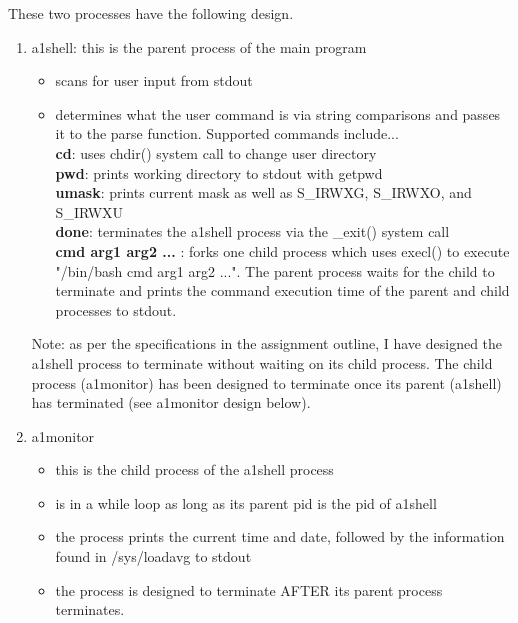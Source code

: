 \documentclass{article}
\begin{document}
\noindent
These two processes have the following design.
\begin{enumerate}
   \item a1shell: this is the parent process of the main program
   \begin{itemize}
     \item scans for user input from stdout
     \item determines what the user command is via string comparisons
       and passes it to the parse function. Supported commands include...\\

     \textbf{cd}: uses chdir() system call to change user directory \\
     \textbf{pwd}: prints working directory to stdout with getpwd\\
     \textbf{umask}: prints current mask as well as S\_IRWXG, S\_IRWXO, and S\_IRWXU\\
     \textbf{done}: terminates the a1shell process via the \_exit() system call \\
     \textbf{cmd arg1 arg2 ...} : forks one child process which uses execl() to execute
     "/bin/bash cmd arg1 arg2 ...". The parent process waits for the child to terminate and
     prints the command execution time of the parent and child processes to stdout. \\
   \end{itemize}

     Note: as per the specifications in the assignment outline, I have designed the a1shell
     process to terminate without waiting on its child process. The child process (a1monitor) has
     been designed to terminate once its parent (a1shell) has terminated (see a1monitor design
     below). \\
   \item a1monitor
   \begin{itemize}
     \item this is the child process of the a1shell process
     \item is in a while loop as long as its parent pid is the pid of a1shell
     \item the process prints the current time and date, followed by the information found
     in /sys/loadavg to stdout
     \item the process is designed to terminate AFTER its parent process terminates.
   \end{itemize}
\end{enumerate}
\end{document}
